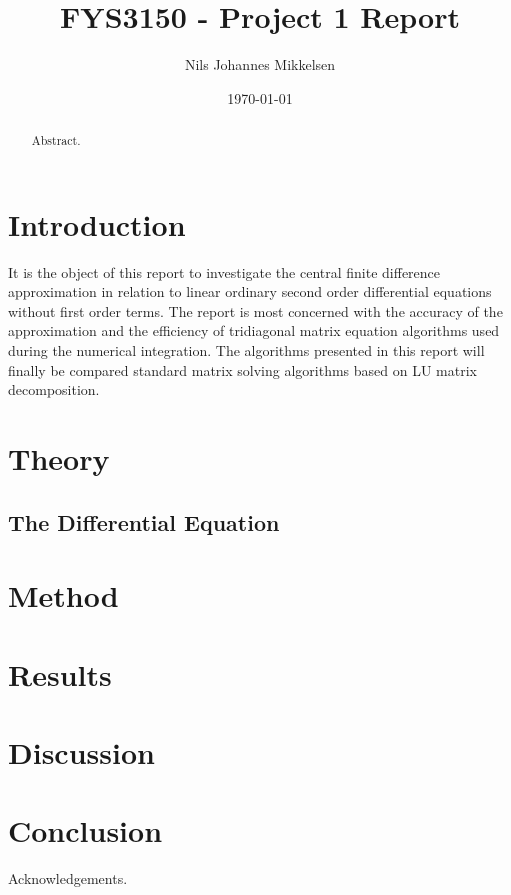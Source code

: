 \documentclass[reprint,english]{revtex4-1}
\begin{document}
\title{FYS3150 - Project 1 Report}
\author{Nils Johannes Mikkelsen}
\date{\today}
\noaffiliation
\begin{abstract}
Abstract.
\end{abstract}
\maketitle

\section{Introduction}
It is the object of this report to investigate the central finite difference approximation in relation to linear ordinary second order differential equations without first order terms. The report is most concerned with the accuracy of the approximation and the efficiency of tridiagonal matrix equation algorithms used during the numerical integration. The algorithms presented in this report will finally be compared standard matrix solving algorithms based on LU matrix decomposition.
\section{Theory}
\subsection{The Differential Equation}

\section{Method}
\section{Results}
\section{Discussion}
\section{Conclusion}
\begin{acknowledgments}
Acknowledgements.
\end{acknowledgments}
\cite{dirac}\cite{einstein}


\end{document}

